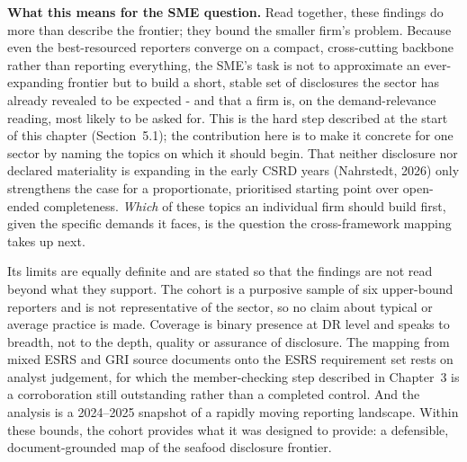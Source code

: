 \textbf{What this means for the SME question.} Read together, these findings do
more than describe the frontier; they bound the smaller firm's problem. Because
even the best-resourced reporters converge on a compact, cross-cutting backbone
rather than reporting everything, the SME's task is not to approximate an
ever-expanding frontier but to build a short, stable set of disclosures the sector
has already revealed to be expected - and that a firm is, on the
demand-relevance reading, most likely to be asked for. This is the hard
step described at the start of this chapter (Section~5.1); the
contribution here is to make it concrete for one sector by naming the
topics on which it should begin. That neither disclosure nor declared
materiality is expanding in the early CSRD years (Nahrstedt, 2026) only
strengthens the case for a proportionate, prioritised starting point
over open-ended completeness. \emph{Which} of these topics an individual firm
should build first, given the specific demands it faces, is the question the
cross-framework mapping takes up next.

Its limits are equally definite and are stated so that the findings are
not read beyond what they support. The cohort is a purposive sample of six
upper-bound reporters and is not representative of the sector, so no claim
about typical or average practice is made. Coverage is binary presence at
DR level and speaks to breadth, not to the depth, quality or assurance of
disclosure. The mapping from mixed ESRS and GRI source documents onto the
ESRS requirement set rests on analyst judgement, for which the member-checking
step described in Chapter~3 is a corroboration still outstanding rather than a
completed control. And the analysis is a 2024--2025 snapshot of a rapidly moving
reporting landscape. Within these
bounds, the cohort provides what it was designed to provide: a defensible,
document-grounded map of the seafood disclosure frontier.


